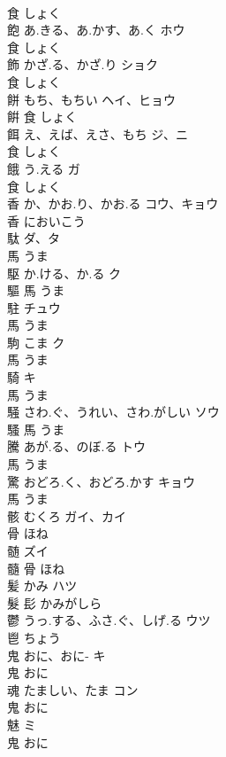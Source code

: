 \documentclass[8pt]{extreport}
\begin{document}
\begin{CJK}{UTF8}{min}
\\	食		しょく		
\\	飽	あ.きる、あ.かす、あ.く	ホウ	
\\	食		しょく		
\\	飾	かざ.る、かざ.り	ショク	
\\	食		しょく		
\\	餅	もち、もちい	ヘイ、ヒョウ	
\\	餠	食		しょく		
\\	餌	え、えば、えさ、もち	ジ、ニ	
\\	食		しょく		
\\	餓	う.える	ガ	
\\	食		しょく		
\\	香	か、かお.り、かお.る	コウ、キョウ	
\\	香		においこう		
\\	駄		ダ、タ	
\\	馬		うま		
\\	駆	か.ける、か.る	ク	
\\	驅	馬		うま		
\\	駐		チュウ	
\\	馬		うま		
\\	駒	こま	ク	
\\	馬		うま		
\\	騎		キ	
\\	馬		うま		
\\	騒	さわ.ぐ、うれい、さわ.がしい	ソウ	
\\	騷	馬		うま		
\\	騰	あが.る、のぼ.る	トウ	
\\	馬		うま		
\\	驚	おどろ.く、おどろ.かす	キョウ	
\\	馬		うま		
\\	骸	むくろ	ガイ、カイ	
\\	骨		ほね		
\\	髄		ズイ	
\\	髓	骨		ほね		
\\	髪	かみ	ハツ	
\\	髮	髟		かみがしら		
\\	鬱	うっ.する、ふさ.ぐ、しげ.る	ウツ	
\\	鬯		ちょう		
\\	鬼	おに、おに-	キ	
\\	鬼		おに		
\\	魂	たましい、たま	コン	
\\	鬼		おに		
\\	魅		ミ	
\\	鬼		おに		

\end{CJK}
\end{document}
